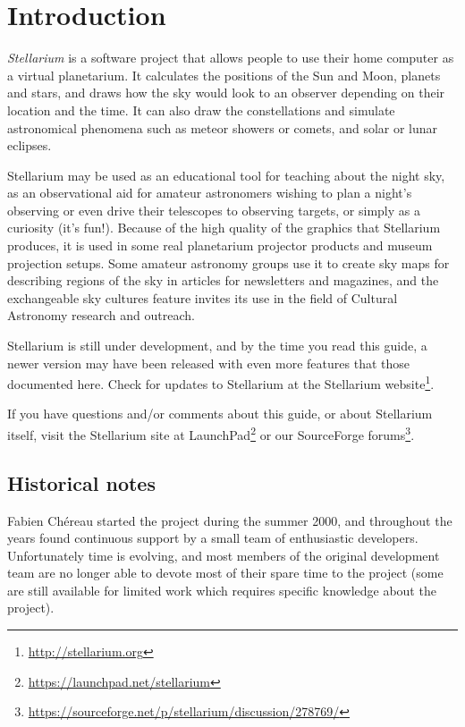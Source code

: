 

\chapter{Introduction}
\label{ch:Introduction}

\emph{Stellarium} is a software project that allows people to use their
home computer as a virtual planetarium. It calculates the positions of
the Sun and Moon, planets and stars, and draws how the sky would look to
an observer depending on their location and the time. It can also draw
the constellations and simulate astronomical phenomena such as meteor
showers or comets, and solar or lunar eclipses.

Stellarium may be used as an educational tool for teaching about the
night sky, as an observational aid for amateur astronomers wishing to
plan a night's observing or even drive their telescopes to observing
targets, or simply as a curiosity (it's fun!). Because of the high
quality of the graphics that Stellarium produces, it is used in some
real planetarium projector products and museum projection setups. Some
amateur astronomy groups use it to create sky maps for describing
regions of the sky in articles for newsletters and magazines, and the
exchangeable sky cultures feature invites its use in the field of
Cultural Astronomy research and outreach.

Stellarium is still under development, and by the time you read
this guide, a newer version may have been released with even more
features that those documented here. Check for updates to Stellarium at
the Stellarium website\footnote{\url{http://stellarium.org}}.

If you have questions and/or comments about this guide, or about
Stellarium itself, visit the Stellarium site at
LaunchPad\footnote{\url{https://launchpad.net/stellarium}} or our
SourceForge forums\footnote{
  \url{https://sourceforge.net/p/stellarium/discussion/278769/}}.


\section{Historical notes}
\label{sec:Introduction:HistoricalNotes}

Fabien Ch\'ereau started the project during the summer 2000, and throughout
the years found continuous support by a small team of enthusiastic developers.
Unfortunately time is evolving, and most members of the original
development team are no longer able to devote most of their spare time
to the project (some are still available for limited work
which requires specific knowledge about the project).

